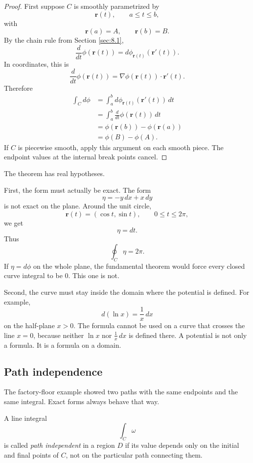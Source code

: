 \begin{proof}
First suppose \(C\) is smoothly parametrized by
\[
    \mathbf r(t),
    \qquad a\le t\le b,
\]
with
\[
    \mathbf r(a)=A,\qquad \mathbf r(b)=B.
\]
By the chain rule from Section \ref{sec:8.1},
\[
    \frac{d}{dt}\phi(\mathbf r(t))
    =
    d\phi_{\mathbf r(t)}(\mathbf r'(t)).
\]
In coordinates, this is
\[
    \frac{d}{dt}\phi(\mathbf r(t))
    =
    \nabla\phi(\mathbf r(t))\cdot\mathbf r'(t).
\]
Therefore
\[
\begin{aligned}
\int_C d\phi
&=
\int_a^b
d\phi_{\mathbf r(t)}(\mathbf r'(t))\,dt\\
&=
\int_a^b
\frac{d}{dt}\phi(\mathbf r(t))\,dt\\
&=
\phi(\mathbf r(b))-\phi(\mathbf r(a))\\
&=
\phi(B)-\phi(A).
\end{aligned}
\]
If \(C\) is piecewise smooth, apply this argument on each smooth piece.  The endpoint
values at the internal break points cancel.
\end{proof}

The theorem has real hypotheses.

First, the form must actually be exact.  The form
\[
    \eta=-y\,dx+x\,dy
\]
is not exact on the plane.  Around the unit circle,
\[
    \mathbf r(t)=(\cos t,\sin t),
    \qquad 0\le t\le2\pi,
\]
we get
\[
    \eta=dt.
\]
Thus
\[
    \oint_C \eta=2\pi.
\]
If \(\eta=d\phi\) on the whole plane, the fundamental theorem would force every closed
curve integral to be \(0\).  This one is not.

Second, the curve must stay inside the domain where the potential is defined.  For
example,
\[
    d(\ln x)=\frac1x\,dx
\]
on the half-plane \(x>0\).  The formula cannot be used on a curve that crosses the
line \(x=0\), because neither \(\ln x\) nor \(\frac1x\,dx\) is defined there.  A potential
is not only a formula.  It is a formula on a domain.

\subsection{Path independence}

The factory-floor example showed two paths with the same endpoints and the same
integral.  Exact forms always behave that way.

\begin{definition}
A line integral
\[
    \int_C \omega
\]
is called \emph{path independent} in a region \(D\) if its value depends only on the
initial and final points of \(C\), not on the particular path connecting them.
\end{definition}

